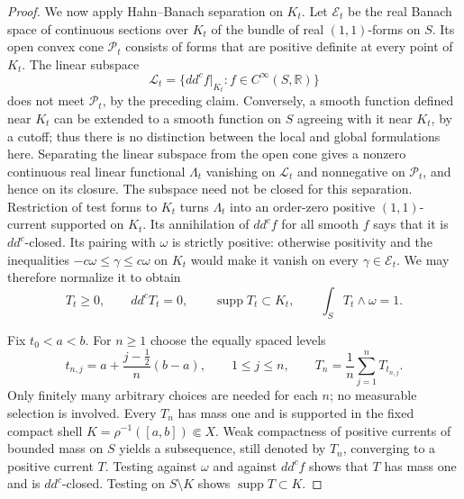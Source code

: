\documentclass[11pt]{amsart}
\theoremstyle{definition}
\theoremstyle{remark}
\numberwithin{equation}{section}
\newcommand{\ddc}{dd^c}
\begin{document}
\begin{proof}
We now apply Hahn--Banach separation on $K_t$.  Let $\mathcal E_t$
be the real Banach space of continuous sections over $K_t$ of the
bundle of real $(1,1)$-forms on $S$.  Its open convex cone
$\mathcal P_t$ consists of forms that are positive definite at every
point of $K_t$.  The linear subspace
\[
 \mathcal L_t
   =\{\ddc f|_{K_t}:f\in C^\infty(S,\mathbb R)\}
\]
does not meet $\mathcal P_t$, by the preceding claim.  Conversely,
a smooth function defined near $K_t$ can be extended to a smooth
function on $S$ agreeing with it near $K_t$, by a cutoff; thus there
is no distinction between the local and global formulations here.
Separating the linear subspace from the open cone gives a nonzero
continuous real linear functional $\Lambda_t$ vanishing on
$\mathcal L_t$ and nonnegative on $\mathcal P_t$, and hence on its
closure.  The subspace need not be closed for this separation.
Restriction of test forms to $K_t$ turns $\Lambda_t$ into an
order-zero positive $(1,1)$-current supported on $K_t$.  Its
annihilation of $\ddc f$ for all smooth $f$ says that it is
$dd^c$-closed.  Its pairing with $\omega$ is strictly positive:
otherwise positivity and the inequalities $-c\omega\leq\gamma
\leq c\omega$ on $K_t$ would make it vanish on every
$\gamma\in\mathcal E_t$.  We may therefore normalize it to obtain
\begin{equation}
\label{eq:level-current}
 T_t\geq0,\qquad \ddc T_t=0,\qquad
 \operatorname{supp}T_t\subset K_t,\qquad
 \int_S T_t\wedge\omega=1.
\end{equation}

Fix $t_0<a<b$.  For $n\geq1$ choose the equally spaced levels
\[
 t_{n,j}=a+\frac{j-\tfrac12}{n}(b-a),\qquad 1\leq j\leq n,
 \qquad T_n=\frac1n\sum_{j=1}^n T_{t_{n,j}}.
\]
Only finitely many arbitrary choices are needed for each $n$;
no measurable selection is involved.  Every $T_n$ has mass one and
is supported in the fixed compact shell
$K=\rho^{-1}([a,b])\Subset X$.  Weak compactness of positive
currents of bounded mass on $S$ yields a subsequence, still denoted
by $T_n$, converging to a positive current $T$.  Testing against
$\omega$ and against $\ddc f$ shows that $T$ has mass one and is
$dd^c$-closed.  Testing on $S\setminus K$ shows
$\operatorname{supp}T\subset K$.


\end{proof}
\end{document}
